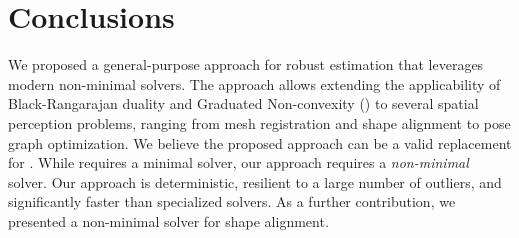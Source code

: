 
\section{Conclusions}
\label{sec:conclusions}

We proposed a general-purpose approach for robust estimation that leverages modern non-minimal solvers. 
The approach allows extending the applicability of Black-Rangarajan duality and Graduated Non-convexity (\GNC) 
to several spatial perception problems, ranging from mesh registration and shape alignment to pose graph optimization.
We believe the proposed approach can be a valid replacement for \ransac. 
While \ransac requires a minimal solver, our \GNC approach requires a \emph{non-minimal} solver. 
 Our approach is deterministic, resilient to a large number of outliers, 
 and significantly faster than specialized solvers. 
 As a further contribution, we presented a non-minimal solver for shape alignment.
